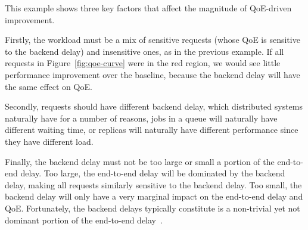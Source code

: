 This example shows three key factors that affect the magnitude of QoE-driven improvement.
\begin{packeditemize}
\item Firstly, the workload must be a mix of sensitive requests (whose QoE is sensitive to the backend delay) and insensitive ones, as in the previous example.
If all requests in Figure~\ref{fig:qoe-curve} were in the red region, we would see little performance improvement over the baseline, because the backend delay will have the same effect on QoE. 

\item Secondly, requests should have different backend delay, which distributed systems naturally have for a number of reasons, \eg jobs in a queue will naturally have different waiting time, or replicas will naturally have different performance since they have different load.

\item Finally, the backend delay must not be too large or small a portion of the end-to-end delay. Too large, the end-to-end delay will be dominated by the backend delay, making all requests similarly sensitive to the backend delay. Too small, the backend delay will only have a very marginal impact on the end-to-end delay and QoE. 
Fortunately, the backend delays typically constitute is a non-trivial yet not dominant portion of the end-to-end delay~\cite{dqbarge,mystery,timecard}.
\end{packeditemize}

